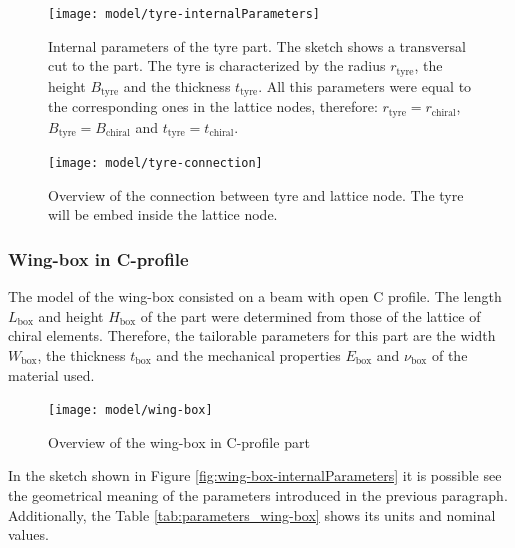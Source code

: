     \begin{figure}[!htpb]
      \centering
      \texttt{[image: model/tyre-internalParameters]}
      \caption[Internal parameters of the tyre part]{Internal parameters of the tyre part. The sketch shows a transversal cut to the part. The tyre is characterized by the radius $r_{\mathrm{tyre}}$, the height $B_{\mathrm{tyre}}$ and the thickness $t_{\mathrm{tyre}}$. All this parameters were equal to the corresponding ones in the lattice nodes, therefore: $r_{\mathrm{tyre}} = r_{\mathrm{chiral}}$, $B_{\mathrm{tyre}} = B_{\mathrm{chiral}}$ and $t_{\mathrm{tyre}} = t_{\mathrm{chiral}}$.}\label{fig:tyre-internalParameters}
    \end{figure}

    \begin{figure}[!htpb]
      \centering
      \texttt{[image: model/tyre-connection]}
      \caption[Overview of the connection between tyre and lattice node]{Overview of the connection between tyre and lattice node. The tyre will be embed inside the lattice node.}\label{fig:tyre-connection}
    \end{figure}

    \clearpage
    \subsubsection{Wing-box in C-profile} \label{subsubsec:wingBox_Parametrization}

    The model of the wing-box consisted on a beam with open C profile. The length $L_{\mathrm{box}}$ and height $H_{\mathrm{box}}$ of the part were determined from those of the lattice of chiral elements. Therefore, the tailorable parameters for this part are the width $W_{\mathrm{box}}$, the thickness $t_{\mathrm{box}}$ and the mechanical properties $E_{\mathrm{box}}$ and $\nu_{\mathrm{box}}$ of the material used.

    \begin{figure}[!htpb]
      \centering
      \texttt{[image: model/wing-box]}
      \caption[Overview of the wing-box in C-profile part]{Overview of the wing-box in C-profile part}\label{fig:wing-box}
    \end{figure}

    In the sketch shown in Figure \ref{fig:wing-box-internalParameters} it is possible see the geometrical meaning of the parameters introduced in the previous paragraph. Additionally, the Table \ref{tab:parameters_wing-box} shows its units and nominal values.

